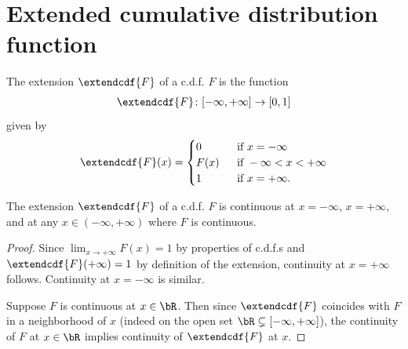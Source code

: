 \section{Extended cumulative distribution function}

\begin{definition}
  \label{def:cdf-extend}
  \leanok
  The extension $\extendcdf{F}$ of a c.d.f. $F$ is the function
  \begin{align*}
    \extendcdf{F} \colon [-\infty,+\infty] \to [0,1]
  \end{align*}
  given by
  \begin{align*}
    \extendcdf{F}(x) = \begin{cases}
      0 & \; \text{ if } x = -\infty \\
      F(x) & \; \text{ if } -\infty < x < +\infty \\
      1 & \; \text{ if } x = +\infty .
      \end{cases}
  \end{align*}
\end{definition}

\begin{lemma}
  \label{lem:cdf-extend-continuity-pts}
  \leanok
  The extension $\extendcdf{F}$ of a c.d.f. $F$ is continuous
  at $x = -\infty$, $x = + \infty$, and at any
  $x \in (-\infty,+\infty)$ where $F$ is continuous.
\end{lemma}
\begin{proof}
  Since $\lim_{x \to +\infty} F(x) = 1$ by properties of c.d.f.s
  and $\extendcdf{F}(+\infty) = 1$ by definition of the extension,
  continuity at $x = + \infty$ follows. Continuity at $x=-\infty$
  is similar.

  Suppose $F$ is continuous at $x \in \bR$.
  Then since $\extendcdf{F}$ coincides with $F$
  in a neighborhood of $x$
  (indeed on the open set $\bR \subsetneq [-\infty,+\infty]$),
  the continuity of $F$ at $x \in \bR$ implies
  continuity of $\extendcdf{F}$ at $x$.
\end{proof}

